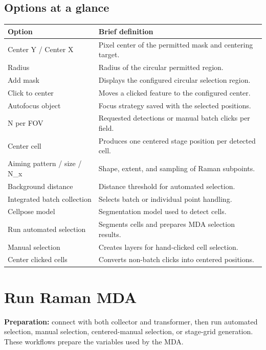 \documentclass[11pt,oneside]{report}
\begin{document}
\section*{Options at a glance}
\begin{longtable}{@{}p{}p{}@{}}
\toprule\textbf{Option} & \textbf{Brief definition}\\\midrule
Center Y / Center X & Pixel center of the permitted mask and centering target.\\
Radius & Radius of the circular permitted region.\\
Add mask & Displays the configured circular selection region.\\
Click to center & Moves a clicked feature to the configured center.\\
Autofocus object & Focus strategy saved with the selected positions.\\
N per FOV & Requested detections or manual batch clicks per field.\\
Center cell & Produces one centered stage position per detected cell.\\
Aiming pattern / size / N\_x & Shape, extent, and sampling of Raman subpoints.\\
Background distance & Distance threshold for automated selection.\\
Integrated batch collection & Selects batch or individual point handling.\\
Cellpose model & Segmentation model used to detect cells.\\
Run automated selection & Segments cells and prepares MDA selection results.\\
Manual selection & Creates layers for hand-clicked cell selection.\\
Center clicked cells & Converts non-batch clicks into centered positions.\\
\bottomrule\end{longtable}

\chapter{Run Raman MDA}

\textbf{Preparation:} connect with both collector and transformer, then run
automated selection, manual selection, centered-manual selection, or stage-grid
generation. These workflows prepare the variables used by the MDA.
\end{document}
